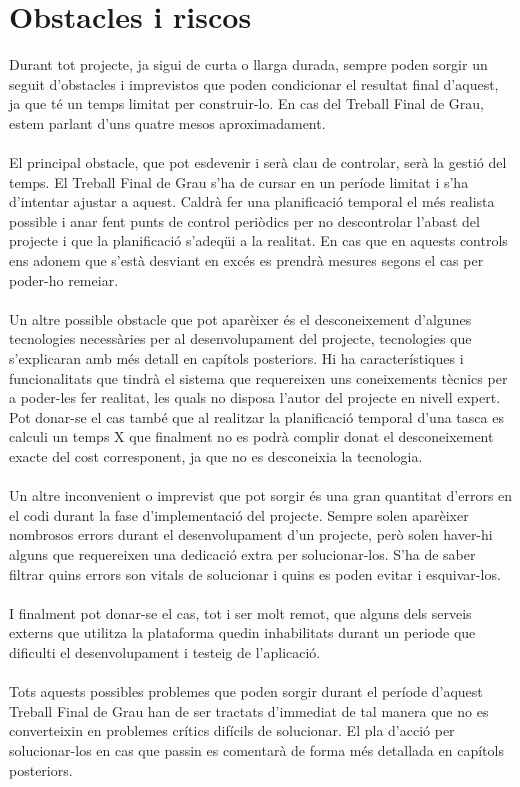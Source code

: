 
\section{Obstacles i riscos}

Durant tot projecte, ja sigui de curta o llarga durada, sempre poden sorgir un seguit d'obstacles i imprevistos que poden condicionar el resultat final d'aquest, ja que té un temps limitat per construir-lo. En cas del Treball Final de Grau, estem parlant d'uns quatre mesos aproximadament.
\\\\
El principal obstacle, que pot esdevenir i serà clau de controlar, serà la gestió del temps. El Treball Final de Grau s'ha de cursar en un període limitat i s'ha d'intentar ajustar a aquest. Caldrà fer una planificació temporal el més realista possible i anar fent punts de control periòdics per no descontrolar l'abast del projecte i que la planificació s'adeqüi a la realitat. En cas que en aquests controls ens adonem que s'està desviant en excés es prendrà mesures segons el cas per poder-ho remeiar.
\\\\
Un altre possible obstacle que pot aparèixer és el desconeixement d'algunes tecnologies necessàries per al desenvolupament del projecte, tecnologies que s'explicaran amb més detall en capítols posteriors. Hi ha característiques i funcionalitats que tindrà el sistema que requereixen uns coneixements tècnics per a poder-les fer realitat, les quals no disposa l'autor del projecte en nivell expert. Pot donar-se el cas també que al realitzar la planificació temporal d'una tasca es calculi un temps X que finalment no es podrà complir donat el desconeixement exacte del cost corresponent, ja que no es desconeixia la tecnologia.
\\\\
Un altre inconvenient o imprevist que pot sorgir és una gran quantitat d'errors en el codi durant la fase d'implementació del projecte. Sempre solen aparèixer nombrosos errors durant el desenvolupament d'un projecte, però solen haver-hi alguns que requereixen una dedicació extra per solucionar-los. S'ha de saber filtrar quins errors son vitals de solucionar i quins es poden evitar i esquivar-los.
\\\\
I finalment pot donar-se el cas, tot i ser molt remot, que alguns dels serveis externs que utilitza la plataforma quedin inhabilitats durant un periode que dificulti el desenvolupament i testeig de l'aplicació.
\\\\
Tots aquests possibles problemes que poden sorgir durant el període d'aquest Treball Final de Grau han de ser tractats d'immediat de tal manera que no es converteixin en problemes crítics difícils de solucionar. El pla d'acció per solucionar-los en cas que passin es comentarà de forma més detallada en capítols posteriors.


